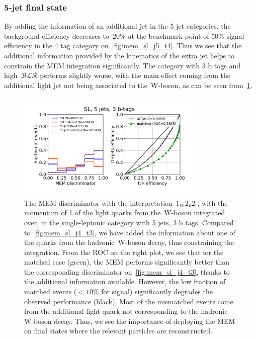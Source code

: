\subsubsection{5-jet final state}
By adding the information of an additional jet in the 5 jet categories, the background efficiency decreases to~$20\%$ at the benchmark point of 50\% signal efficiency in the 4 tag category on~\cref{fig:mem_sl_j5_t4}. Thus we see that the additional information provided by the kinematics of the extra jet helps to constrain the MEM integration significantly. The category with 3 b tags and high~$\mathcal{BLR}$ performs slightly worse, with the main effect coming from the additional light jet not being associated to the~$\mathrm{W}$-boson, as can be seen from~\cref{fig:mem_sl_j5_t3}.

\begin{figure}[ht]
\begin{centering}
\includegraphics[width = 0.8\textwidth]{figures/mem/mem_sl_j5_t3.pdf}
\caption[MEM with the~$1_{\mathrm{W}} 2_{\mathrm{h}} 2_{\mathrm{t}}$ interpretation in the 5 jet, 3 b~tag category]{The MEM discriminator with the interpretation~$1_{\mathrm{W}} 2_{\mathrm{h}} 2_{\mathrm{t}}$, with the momentum of 1 of the light quarks from the~$\mathrm{W}$-boson integrated over, in the single-leptonic category with 5 jets, 3 b tags. Compared to~\cref{fig:mem_sl_j4_t3}, we have added the information about one of the quarks from the hadronic~$\mathrm{W}$-boson decay, thus constraining the integration. From the ROC on the right plot, we see that for the matched case (green), the MEM performs significantly better than the corresponding discriminator on~\cref{fig:mem_sl_j4_t3}, thanks to the additional information available. However, the low fraction of matched events ($< 10\%$ for signal) significantly degrades the observed performance (black). Most of the mismatched events come from the additional light quark not corresponding to the hadronic~$\mathrm{W}$-boson decay. Thus, we see the importance of deploying the MEM on final states where the relevant particles are reconstructed.}
\label{fig:mem_sl_j5_t3}
\end{centering}
\end{figure}

